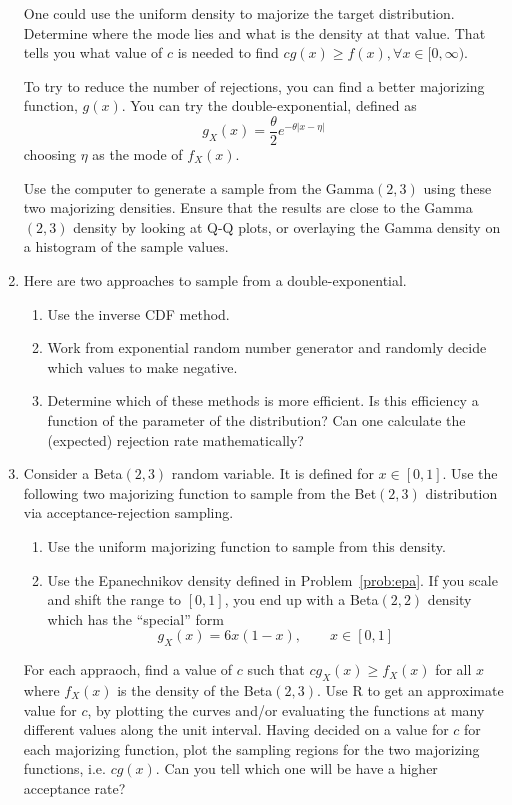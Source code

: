 \begin{enumerate}
  One could use the uniform density to majorize the target distribution. Determine where the mode lies and what is the density at that value. That tells you what value of $c$ is needed to find $c g(x) \ge f(x), \forall x \in [0, \infty)$.

  To try to reduce the number of rejections, you can find a better majorizing function, $g(x)$.  You can try the double-exponential, defined as
$$
  g_X(x) = \frac{\theta}{2}e^{-\theta \vert x - \eta \vert}
$$ 
   choosing $\eta$ as the mode of $f_X(x)$.

   Use the computer to generate a sample from the Gamma$(2, 3)$ using these two majorizing densities. Ensure that the results are close to the Gamma$(2, 3)$ density by looking at Q-Q plots, or overlaying the Gamma density on a histogram of the sample values.

\item  Here are two approaches to sample from a double-exponential.
\begin{enumerate}
\item   Use the inverse CDF method.
\item   Work from exponential random number generator  and randomly decide which values to make negative.
\item Determine which of these methods is more efficient. Is this efficiency a function of the parameter of the distribution?  Can one calculate the (expected) rejection rate mathematically?
\end{enumerate}

\item
Consider a Beta$(2, 3)$ random variable. It is defined for $x \in [0, 1]$.  Use the following two majorizing function to sample from the Bet$(2, 3)$ distribution via acceptance-rejection sampling.

\begin{enumerate}
\item Use the uniform majorizing function to sample from this density.
\item Use the Epanechnikov density defined in Problem~\ref{prob:epa}. If you scale and shift the range to $[0, 1]$, you end up with a Beta$(2, 2)$ density which has the ``special'' form
$$
  g_X(x) = 6x(1-x), \qquad x \in [0, 1]$$
\end{enumerate}
For each appraoch, find a value of $c$ such that $c g_X(x) \ge f_X(x)$
for all $x$ where $f_X(x)$ is the density of the Beta$(2, 3)$.  Use R
to get an approximate value for $c$, by plotting the curves and/or
evaluating the functions at many different values along the unit
interval.  Having decided on a value for $c$ for each majorizing
function, plot the sampling regions for the two majorizing functions,
i.e. $c g(x)$.  Can you tell which one will be have a higher
acceptance rate?



\end{enumerate}
